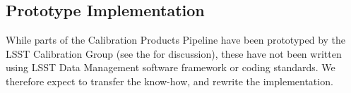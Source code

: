 
\subsection{Prototype Implementation}
\label{sec:CPP:prototypeImplementation}
While parts of the Calibration Products Pipeline have been prototyped by the LSST Calibration Group (see the \NewPCP for discussion), these have not been written using LSST Data Management software framework or coding standards. We therefore expect to transfer the know-how, and rewrite the implementation.












%


